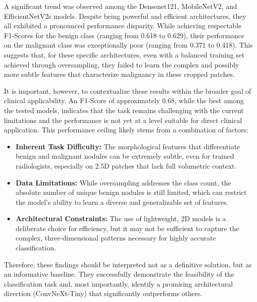 A significant trend was observed among the Densenet121, MobileNetV2, and EfficientNetV2s models. Despite being powerful and efficient architectures, they all exhibited a pronounced performance disparity. While achieving respectable F1-Scores for the benign class (ranging from 0.618 to 0.629), their performance on the malignant class was exceptionally poor (ranging from 0.371 to 0.418). This suggests that, for these specific architectures, even with a balanced training set achieved through oversampling, they failed to learn the complex and possibly more subtle features that characterize malignancy in these cropped patches.

It is important, however, to contextualize these results within the broader goal of clinical applicability. An F1-Score of approximately 0.68, while the best among the tested models, indicates that the task remains challenging with the current limitations and the performance is not yet at a level suitable for direct clinical application. This performance ceiling likely stems from a combination of factors:
\begin{itemize}
    \item \textbf{Inherent Task Difficulty:} The morphological features that differentiate benign and malignant nodules can be extremely subtle, even for trained radiologists, especially on 2.5D patches that lack full volumetric context.
    \item \textbf{Data Limitations:} While oversampling addresses the class count, the absolute number of unique benign nodules is still limited, which can restrict the model's ability to learn a diverse and generalizable set of features.
    \item \textbf{Architectural Constraints:} The use of lightweight, 2D models is a deliberate choice for efficiency, but it may not be sufficient to capture the complex, three-dimensional patterns necessary for highly accurate classification.
\end{itemize}

Therefore, these findings should be interpreted not as a definitive solution, but as an informative baseline. They successfully demonstrate the feasibility of the classification task and, most importantly, identify a promising architectural direction (ConvNeXt-Tiny) that significantly outperforms others. 
